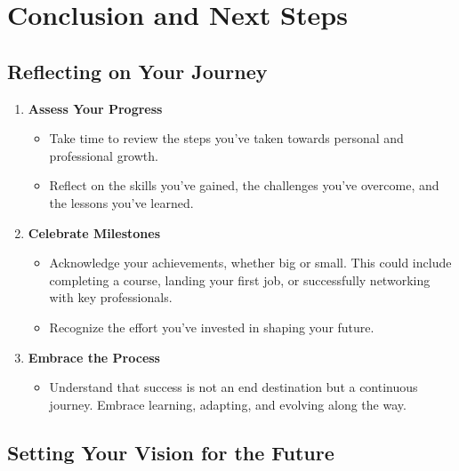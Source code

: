\documentclass[
  letterpaper,
  DIV=11,
  numbers=noendperiod]{scrreprt}
\providecommand{\tightlist}{%
  \setlength{\itemsep}{0pt}\setlength{\parskip}{0pt}}\usepackage{longtable,booktabs,array}
\begin{document}

\chapter{Conclusion and Next Steps}\label{conclusion-and-next-steps}

\section{Reflecting on Your Journey}\label{reflecting-on-your-journey}

\begin{enumerate}
\def\labelenumi{\arabic{enumi}.}
\item
  \textbf{Assess Your Progress}

  \begin{itemize}
  \tightlist
  \item
    Take time to review the steps you've taken towards personal and
    professional growth.
  \item
    Reflect on the skills you've gained, the challenges you've overcome,
    and the lessons you've learned.
  \end{itemize}
\item
  \textbf{Celebrate Milestones}

  \begin{itemize}
  \tightlist
  \item
    Acknowledge your achievements, whether big or small. This could
    include completing a course, landing your first job, or successfully
    networking with key professionals.
  \item
    Recognize the effort you've invested in shaping your future.
  \end{itemize}
\item
  \textbf{Embrace the Process}

  \begin{itemize}
  \tightlist
  \item
    Understand that success is not an end destination but a continuous
    journey. Embrace learning, adapting, and evolving along the way.
  \end{itemize}
\end{enumerate}

\section{Setting Your Vision for the
Future}\label{setting-your-vision-for-the-future}
\end{document}
